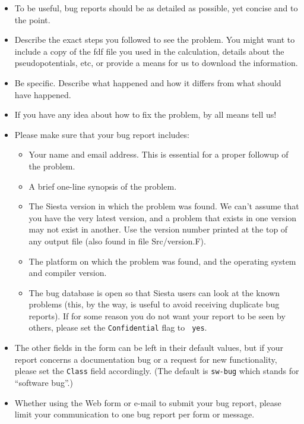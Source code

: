 \documentclass[11pt]{article}
\begin{document}
\begin{itemize}

\item To be useful, bug reports should be as detailed as possible, yet
concise and to the point.

\item Describe the exact steps you followed to see the problem. You
might want to include a copy of the fdf file you used in the
calculation, details about the pseudopotentials, etc, or provide a
means for us to download the information.

\item Be specific. Describe what happened and how it differs from what
should have happened.

\item If you have any idea about how to fix the problem, by all means
tell us!

\item Please make sure that your bug report includes:

\begin{itemize}

\item Your name and email address.  This is essential for a proper
followup of the problem.

\item A brief one-line synopsis of the problem.

\item The {\sc Siesta} version in which the problem was found. We can't
assume that you have the very latest version, and a problem that exists in
one version may not exist in another. Use the version number printed
at the top of any output file (also found in file Src/version.F).

\item The platform on which the problem was found, and the operating
system and compiler version.

\item The bug database is open so that {\sc Siesta} users can look at the
known problems (this, by the way, is useful to avoid receiving
duplicate bug reports). If for some reason you do not want your report
to be seen by others, please set the {\tt Confidential} flag to {\tt
yes}.

\end{itemize}

\item The other fields in the form can be left in their default
values, but if your report concerns a documentation bug or a request
for new functionality, please set the {\tt Class} field
accordingly. (The default is {\tt sw-bug} which stands for ``software
bug''.)


\item Whether using the Web form or e-mail to submit your bug report,
please limit your communication to one bug report per form or message.

\end{itemize}
\end{document}
